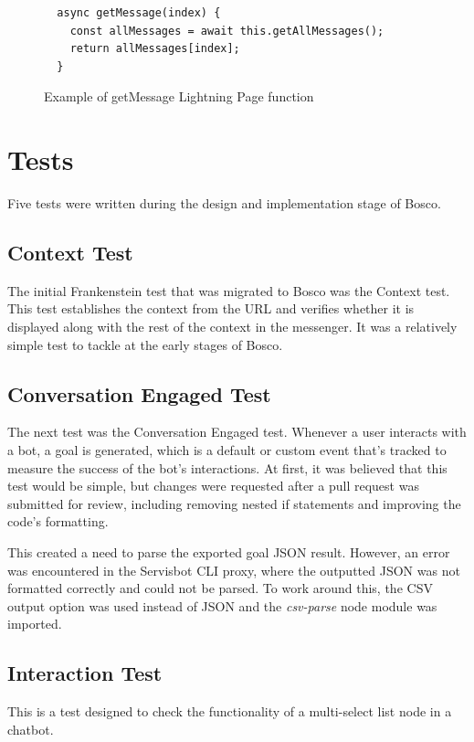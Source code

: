 \documentclass[12pt,a4paper,titlepage]{report}
\begin{document}
\begin{figure}[H]
 \begin{tcolorbox}
  \begin{verbatim}
  async getMessage(index) {
    const allMessages = await this.getAllMessages();
    return allMessages[index];
  }
  \end{verbatim}
 \end{tcolorbox}
 \caption{Example of getMessage Lightning Page function}
\end{figure}

\section{Tests}
Five tests were written during the design and implementation stage of Bosco. 
\subsection{Context Test}
The initial Frankenstein test that was migrated to Bosco was the Context test. 
This test establishes the context from the URL and verifies whether it is displayed along with the rest of the context in the messenger. 
It was a relatively simple test to tackle at the early stages of Bosco.

\subsection{Conversation Engaged Test}
The next test was the Conversation Engaged test. Whenever a user interacts with a bot, a goal is generated, which is a default or custom event that's tracked to measure the success of the bot's interactions.
At first, it was believed that this test would be simple, but changes were requested after a pull request was submitted for review, including removing nested if statements and improving the code's formatting.

This created a need to parse the exported goal \ac{JSON} result. However, an error was encountered in the Servisbot \ac{CLI} proxy, where the outputted JSON was not formatted correctly and could not be parsed. 
To work around this, the \ac{CSV} output option was used instead of JSON and the \textit{csv-parse} node module was imported.

\subsection{Interaction Test}
This is a test designed to check the functionality of a multi-select list node in a chatbot.
\end{document}
